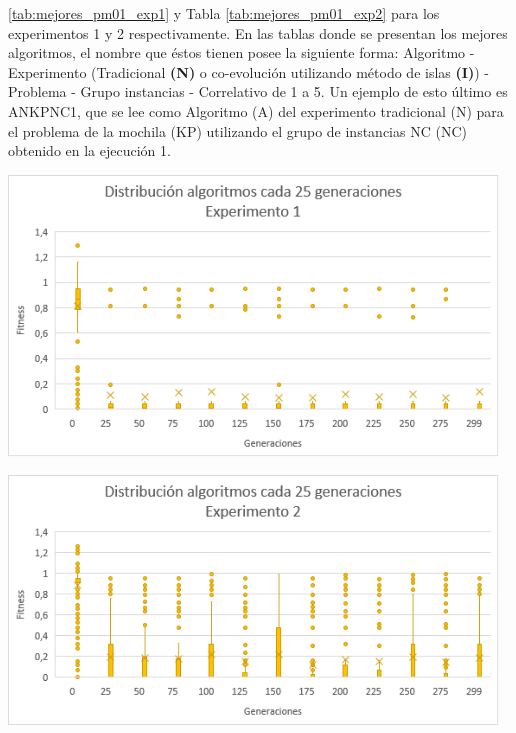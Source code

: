 \ref{tab:mejores_pm01_exp1} y Tabla \ref{tab:mejores_pm01_exp2} para los experimentos 1 y 2 respectivamente. En las tablas donde se presentan los mejores algoritmos, el nombre que éstos tienen posee la siguiente forma: Algoritmo - Experimento (Tradicional \textbf{(N)} o co-evolución utilizando método de islas \textbf{(I)}) - Problema - Grupo instancias - Correlativo de 1 a 5. Un ejemplo de esto último es ANKPNC1, que se lee como Algoritmo (A) del experimento tradicional (N) para el problema de la mochila (KP) utilizando el grupo de instancias NC (NC) obtenido en la ejecución 1.

\begingroup
    \centering
    \includegraphics[width=13cm]{images/cap6/box_whisker_exp1.png}
    \label{fig:box_whisker_exp1}
\endgroup

\begingroup
    \centering
    \includegraphics[width=13cm]{images/cap6/box_whisker_exp2.png}
    \label{fig:box_whisker_exp2}
\endgroup

